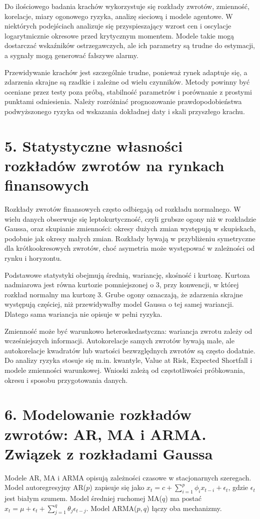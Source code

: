 \documentclass[11pt,a4paper,oneside]{report}
\begin{document}
Do ilościowego badania krachów wykorzystuje się rozkłady zwrotów, zmienność, korelacje, miary ogonowego ryzyka, analizę sieciową i modele agentowe. W niektórych podejściach analizuje się przyspieszający wzrost cen i oscylacje logarytmicznie okresowe przed krytycznym momentem. Modele takie mogą dostarczać wskaźników ostrzegawczych, ale ich parametry są trudne do estymacji, a sygnały mogą generować fałszywe alarmy.

Przewidywanie krachów jest szczególnie trudne, ponieważ rynek adaptuje się, a zdarzenia skrajne są rzadkie i zależne od wielu czynników. Metody powinny być oceniane przez testy poza próbą, stabilność parametrów i porównanie z prostymi punktami odniesienia. Należy rozróżniać prognozowanie prawdopodobieństwa podwyższonego ryzyka od wskazania dokładnej daty i skali przyszłego krachu.

\section{5. Statystyczne własności rozkładów zwrotów na rynkach finansowych}
Rozkłady zwrotów finansowych często odbiegają od rozkładu normalnego. W wielu danych obserwuje się leptokurtyczność, czyli grubsze ogony niż w rozkładzie Gaussa, oraz skupianie zmienności: okresy dużych zmian występują w skupiskach, podobnie jak okresy małych zmian. Rozkłady bywają w przybliżeniu symetryczne dla krótkookresowych zwrotów, choć asymetria może występować w zależności od rynku i horyzontu.

Podstawowe statystyki obejmują średnią, wariancję, skośność i kurtozę. Kurtoza nadmiarowa jest równa kurtozie pomniejszonej o 3, przy konwencji, w której rozkład normalny ma kurtozę 3. Grube ogony oznaczają, że zdarzenia skrajne występują częściej, niż przewidywałby model Gaussa o tej samej wariancji. Dlatego sama wariancja nie opisuje w pełni ryzyka.

Zmienność może być warunkowo heteroskedastyczna: wariancja zwrotu zależy od wcześniejszych informacji. Autokorelacje samych zwrotów bywają małe, ale autokorelacje kwadratów lub wartości bezwzględnych zwrotów są często dodatnie. Do analizy ryzyka stosuje się m.in. kwantyle, Value at Risk, Expected Shortfall i modele zmienności warunkowej. Wnioski zależą od częstotliwości próbkowania, okresu i sposobu przygotowania danych.

\section{6. Modelowanie rozkładów zwrotów: AR, MA i ARMA. Związek z rozkładami Gaussa}
Modele AR, MA i ARMA opisują zależności czasowe w stacjonarnych szeregach. Model autoregresyjny AR(\(p\)) zapisuje się jako \(x_t=c+\sum_{i=1}^p\phi_ix_{t-i}+\epsilon_t\), gdzie \(\epsilon_t\) jest białym szumem. Model średniej ruchomej MA(\(q\)) ma postać \(x_t=\mu+\epsilon_t+\sum_{j=1}^q\theta_j\epsilon_{t-j}\). Model ARMA(\(p,q\)) łączy oba mechanizmy.
\end{document}
